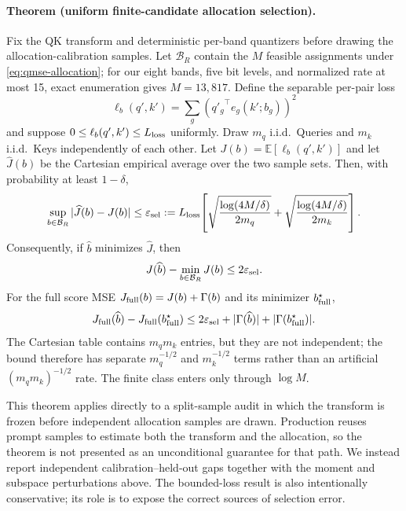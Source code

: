 \paragraph{Theorem (uniform finite-candidate allocation selection).}
Fix the QK transform and deterministic per-band quantizers before drawing
the allocation-calibration samples.  Let $\mathcal B_R$ contain the $M$
feasible assignments under \cref{eq:qmse-allocation}; for our eight bands,
five bit levels, and normalized rate at most 15, exact enumeration gives
$M=13{,}817$.  Define the separable per-pair loss
\begin{equation}
 \ell_b(q',k')=
 \sum_g\left({q'_g}^{\top}e_g(k';b_g)\right)^2
\end{equation}
and suppose $0\le\ell_b(q',k')\le L_{\rm loss}$ uniformly.
Draw $m_q$ i.i.d.\ Queries and $m_k$ i.i.d.\ Keys independently of each
other.  Let $J(b)=\mathbb E[\ell_b(q',k')]$ and let $\widehat J(b)$ be the
Cartesian empirical average over the two sample sets.
Then, with probability at least $1-\delta$,
\begin{equation}
 \sup_{b\in\mathcal B_R}|\widehat J(b)-J(b)|
 \le
 \varepsilon_{\rm sel}:=
 L_{\rm loss}\!\left[
 \sqrt{\frac{\log(4M/\delta)}{2m_q}}+
 \sqrt{\frac{\log(4M/\delta)}{2m_k}}
 \right].
 \label{eq:allocation-uniform-bound}
\end{equation}
Consequently, if $\widehat b$ minimizes $\widehat J$, then
\begin{equation}
 J(\widehat b)-\min_{b\in\mathcal B_R}J(b)
 \le2\varepsilon_{\rm sel}.
 \label{eq:allocation-selection-regret}
\end{equation}
For the full score MSE
$J_{\rm full}(b)=J(b)+\Gamma(b)$ and its minimizer
$b_{\rm full}^\star$,
\begin{equation}
 J_{\rm full}(\widehat b)-J_{\rm full}(b_{\rm full}^\star)
 \le
 2\varepsilon_{\rm sel}
 +|\Gamma(\widehat b)|+|\Gamma(b_{\rm full}^\star)|.
 \label{eq:allocation-full-regret}
\end{equation}
The Cartesian table contains $m_qm_k$ entries, but they are not independent;
the bound therefore has separate $m_q^{-1/2}$ and $m_k^{-1/2}$ terms rather
than an artificial $(m_qm_k)^{-1/2}$ rate.  The finite class enters only
through $\log M$.

This theorem applies directly to a split-sample audit in which the transform
is frozen before independent allocation samples are drawn.  Production
reuses prompt samples to estimate both the transform and the allocation, so
the theorem is not presented as an unconditional guarantee for that path.
We instead report independent calibration--held-out gaps together with the
moment and subspace perturbations above.  The bounded-loss result is also
intentionally conservative; its role is to expose the correct sources of
selection error.

